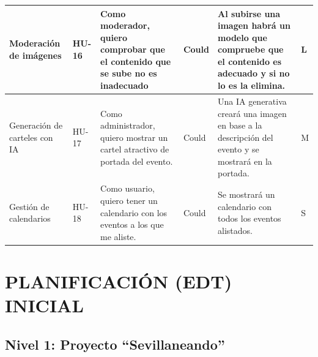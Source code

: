 \documentclass[12pt]{article}
\begin{document}
\begin{longtable}{|p{2.0cm}|p{1.0cm}|p{5cm}|p{2cm}|p{4cm}|p{1cm}|}
Moderación de imágenes & HU-16 &
Como moderador, quiero comprobar que el contenido que se sube no es inadecuado &
Could &
Al subirse una imagen habrá un modelo que compruebe que el contenido es adecuado y si no lo es la elimina. &
L \\
\hline

Generación de carteles con IA & HU-17 &
Como administrador, quiero mostrar un cartel atractivo de portada del evento. &
Could &
Una IA generativa creará una imagen en base a la descripción del evento y se mostrará en la portada. &
M \\
\hline

Gestión de calendarios & HU-18 &
Como usuario, quiero tener un calendario con los eventos a los que me aliste. &
Could &
Se mostrará un calendario con todos los eventos alistados. &
S \\
\hline

\end{longtable}

\section{PLANIFICACIÓN (EDT) INICIAL}

\subsection{Nivel 1: Proyecto ``Sevillaneando''}
\end{document}
